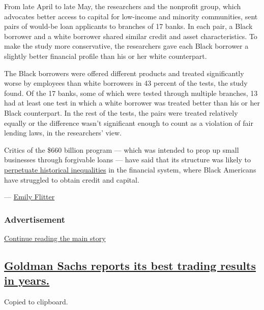 From late April to late May, the researchers and the nonprofit group,
which advocates better access to capital for low-income and minority
communities, sent pairs of would-be loan applicants to branches of 17
banks. In each pair, a Black borrower and a white borrower shared
similar credit and asset characteristics. To make the study more
conservative, the researchers gave each Black borrower a slightly better
financial profile than his or her white counterpart.

The Black borrowers were offered different products and treated
significantly worse by employees than white borrowers in 43 percent of
the tests, the study found. Of the 17 banks, some of which were tested
through multiple branches, 13 had at least one test in which a white
borrower was treated better than his or her Black counterpart. In the
rest of the tests, the pairs were treated relatively equally or the
difference wasn't significant enough to count as a violation of fair
lending laws, in the researchers' view.

Critics of the \$660 billion program --- which was intended to prop up
small businesses through forgivable loans --- have said that its
structure was likely to
\href{https://www.nytimes.com/2020/04/10/business/minority-business-coronavirus-loans.html}{perpetuate
historical inequalities} in the financial system, where Black Americans
have struggled to obtain credit and capital.

--- \href{https://www.nytimes.com/by/emily-flitter}{Emily Flitter}

\hypertarget{advertisement-1}{%
\subsubsection{Advertisement}\label{advertisement-1}}

\protect\hyperlink{after-dfp-ad-mid2}{Continue reading the main story}

\hypertarget{goldman-sachs-reports-its-best-trading-results-in-years}{%
\subsection{\texorpdfstring{\protect\hyperlink{goldman-sachs-reports-its-best-trading-results-in-years}{Goldman
Sachs reports its best trading results in
years.}}{Goldman Sachs reports its best trading results in years.}}\label{goldman-sachs-reports-its-best-trading-results-in-years}}

Copied to clipboard.

